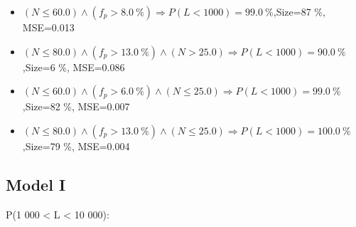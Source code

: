 \documentclass[numbered]{CSL}
\begin{document}
\begin{itemize}
\item $(N \leq 60.0) \land (f_p > 8.0~\%) \Rightarrow P(L < 1 000) = 99.0~\%$,\hfill Size=87 \%, MSE=0.013
\item $(N \leq 80.0) \land (f_p > 13.0~\%) \land (N > 25.0) \Rightarrow P(L < 1 000) = 90.0~\%$,\hfill Size=6 \%, MSE=0.086
\item $(N \leq 60.0) \land (f_p > 6.0~\%) \land (N \leq 25.0) \Rightarrow P(L < 1 000) = 99.0~\%$,\hfill Size=82 \%, MSE=0.007
\item $(N \leq 80.0) \land (f_p > 13.0~\%) \land (N \leq 25.0) \Rightarrow P(L < 1 000) = 100.0~\%$,\hfill Size=79 \%, MSE=0.004
\end{itemize}

\subsection{Model I}
P(1 000 < L < 10 000):
\end{document}
